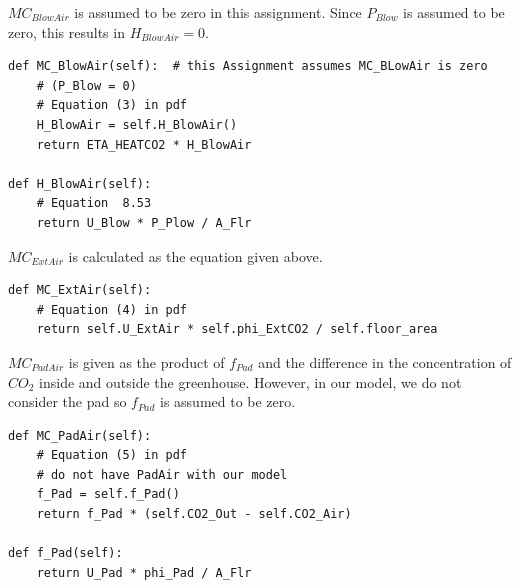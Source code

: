 \documentclass[a4paper]{article}
\numberwithin{equation}{section}
\begin{document}
\( MC_{BlowAir} \) is assumed to be zero in this assignment.
Since \( P_{Blow} \) is assumed to be zero, this results in \( H_{BlowAir} = 0 \).
\begin{mdframed}[leftline=false,rightline=false,backgroundcolor=magenta!10,nobreak=true]
  \begin{verbatim}
def MC_BlowAir(self):  # this Assignment assumes MC_BLowAir is zero
    # (P_Blow = 0)
    # Equation (3) in pdf
    H_BlowAir = self.H_BlowAir()
    return ETA_HEATCO2 * H_BlowAir
    
def H_BlowAir(self):
    # Equation  8.53
    return U_Blow * P_Plow / A_Flr
  \end{verbatim}
\end{mdframed}

\( MC_{ExtAir} \) is calculated as the equation given above.
\begin{mdframed}[leftline=false,rightline=false,backgroundcolor=magenta!10,nobreak=true]
  \begin{verbatim}
def MC_ExtAir(self):
    # Equation (4) in pdf
    return self.U_ExtAir * self.phi_ExtCO2 / self.floor_area
  \end{verbatim}
\end{mdframed}

\( MC_{PadAir} \) is given as the product of \( f_{Pad} \) and the difference in the concentration of \( CO_2 \) inside and outside the greenhouse. However, in our model, we do not consider the pad so \( f_{Pad} \) is assumed to be zero.
\begin{mdframed}[leftline=false,rightline=false,backgroundcolor=magenta!10,nobreak=true]
  \begin{verbatim}
def MC_PadAir(self):
    # Equation (5) in pdf
    # do not have PadAir with our model
    f_Pad = self.f_Pad()
    return f_Pad * (self.CO2_Out - self.CO2_Air)
    
def f_Pad(self):
    return U_Pad * phi_Pad / A_Flr
  \end{verbatim}
\end{mdframed}
\end{document}
